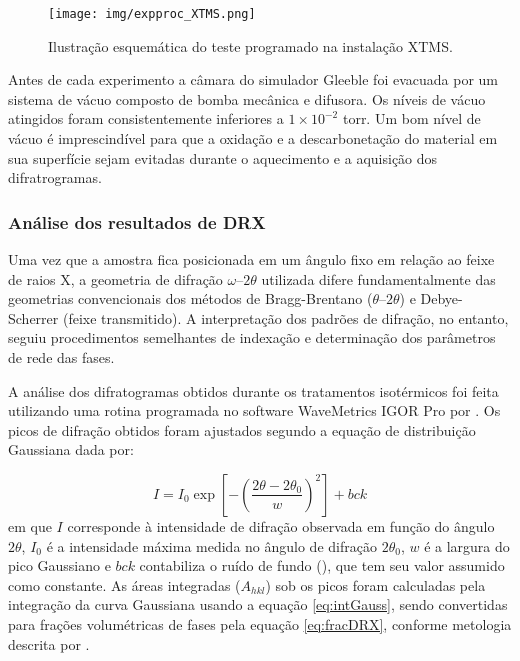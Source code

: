 \begin{figure}
	\texttt{[image: img/expproc\_XTMS.png]}
	\caption{Ilustração esquemática do teste programado na instalação XTMS.}
	\label{fig:esqXTMS}
\end{figure}

Antes de cada experimento a câmara do simulador Gleeble foi evacuada por um sistema de vácuo composto de bomba mecânica e difusora. Os níveis de vácuo atingidos foram consistentemente inferiores a $1 \times 10^{-2}$ torr. Um bom nível de vácuo é imprescindível para que a oxidação e a descarbonetação do material em sua superfície sejam evitadas durante o aquecimento e a aquisição dos difratrogramas.

\subsubsection{An\'{a}lise dos resultados de DRX}

Uma vez que a amostra fica posicionada em um ângulo fixo em relação ao feixe de raios X, a geometria de difração $\omega$--$2\theta$ utilizada difere fundamentalmente das geometrias convencionais dos métodos de Bragg-Brentano ($\theta$--$2\theta$) e Debye-Scherrer (feixe transmitido). A interpretação dos padrões de difração, no entanto, seguiu procedimentos semelhantes de indexação e determinação dos parâmetros de rede das fases.

A análise dos difratogramas obtidos durante os tratamentos isotérmicos foi feita utilizando uma rotina programada no software WaveMetrics IGOR Pro\textregistered{} por . Os picos de difração obtidos foram ajustados segundo a equação de distribuição Gaussiana dada por:

\begin{equation}
	I = I_0 \exp{\left[-\left(\frac{2\theta - 2\theta_0}{w}\right)^2\right]} + bck
	\label{eq:Gaussiana}
\end{equation}
%
em que $I$ corresponde à intensidade de difração observada em função do ângulo $2\theta$, $I_0$ é a intensidade máxima medida no ângulo de difração $2\theta_0$, $w$ é a largura do pico Gaussiano e $bck$ contabiliza o ruído de fundo (), que tem seu valor assumido como constante. As áreas integradas ($A_{hkl}$) sob os picos foram calculadas pela integração da curva Gaussiana usando a equação \ref{eq:intGauss}, sendo convertidas para frações volumétricas de fases pela equação \ref{eq:fracDRX}, conforme metologia descrita por .

